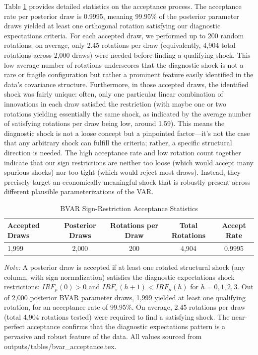\documentclass[12pt]{article}
\begin{document}
Table \ref{tab:bvar_accept} provides detailed statistics on the acceptance process. The acceptance rate per posterior draw is 0.9995, meaning 99.95\% of the posterior parameter draws yielded at least one orthogonal rotation satisfying our diagnostic expectations criteria. For each accepted draw, we performed up to 200 random rotations; on average, only 2.45 rotations per draw (equivalently, 4,904 total rotations across 2,000 draws) were needed before finding a qualifying shock. This low average number of rotations underscores that the diagnostic shock is not a rare or fragile configuration but rather a prominent feature easily identified in the data's covariance structure. Furthermore, in those accepted draws, the identified shock was fairly unique: often, only one particular linear combination of innovations in each draw satisfied the restriction (with maybe one or two rotations yielding essentially the same shock, as indicated by the average number of satisfying rotations per draw being low, around 1.59). This means the diagnostic shock is not a loose concept but a pinpointed factor—it's not the case that any arbitrary shock can fulfill the criteria; rather, a specific structural direction is needed. The high acceptance rate and low rotation count together indicate that our sign restrictions are neither too loose (which would accept many spurious shocks) nor too tight (which would reject most draws). Instead, they precisely target an economically meaningful shock that is robustly present across different plausible parameterizations of the VAR.

\begin{table}[!htbp]
    \centering
    \small
    \caption{BVAR Sign-Restriction Acceptance Statistics}
    \label{tab:bvar_accept}
    \begin{threeparttable}
        \begin{tabular}{@{}lcccc@{}}
            \toprule
            Accepted Draws & Posterior Draws & Rotations per Draw & Total Rotations & Accept Rate \\
            \midrule
            1,999          & 2,000           & 200                & 4,904           & 0.9995      \\
            \bottomrule
        \end{tabular}
        \begin{tablenotes}[flushleft]
            \footnotesize
            \item \textit{Note:} A posterior draw is accepted if at least one rotated structural shock (any column, with sign normalization) satisfies the diagnostic expectations shock restrictions: $IRF_{\mu}(0)>0$ and $IRF_{\pi}(h+1) < IRF_{\mu}(h)$ for $h=0,1,2,3$. Out of 2,000 posterior BVAR parameter draws, 1,999 yielded at least one qualifying rotation, for an acceptance rate of 99.95\%. On average, 2.45 rotations per draw (total 4,904 rotations tested) were required to find a satisfying shock. The near-perfect acceptance confirms that the diagnostic expectations pattern is a pervasive and robust feature of the data. All values sourced from outputs/tables/bvar\_acceptance.tex.
        \end{tablenotes}
    \end{threeparttable}
\end{table}
\end{document}
